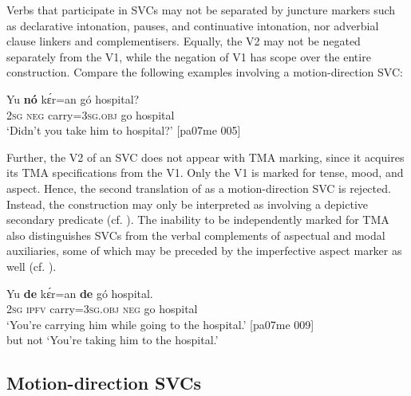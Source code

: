 Verbs that participate in SVCs may not be separated by juncture markers such as declarative intonation, pauses, and continuative intonation, nor adverbial clause linkers and complementisers. Equally, the V2 may not be negated separately from the V1, while the negation of V1 has scope over the entire construction. Compare the following examples involving a motion-direction SVC:



\z


\ea%
    \label{ex:key:1541}
    \gll Yu  \textbf{nó}  kɛ́r=an    gó  hospital?\\
\textsc{2sg}  \textsc{neg}  carry=\textsc{3sg.obj}  go  hospital\\
\glt ‘Didn’t you take him to hospital?’ [pa07me 005]
\z

Further, the V2 of an SVC does not appear with TMA marking, since it acquires its TMA specifications from the V1. Only the V1 is marked for tense, mood, and aspect. Hence, the second translation of  as a motion-direction SVC is rejected. Instead, the construction may only be interpreted as involving a depictive secondary predicate (cf. ). The inability to be independently marked for TMA also distinguishes SVCs from the verbal complements of aspectual and modal auxiliaries, some of which may be preceded by the imperfective aspect marker as well (cf. ). 


\ea%
    \label{ex:key:1542}
    \gll Yu  \textbf{de}  kɛ́r=an    \textbf{de}  gó  hospital.\\
\textsc{2sg}  \textsc{ipfv}  carry=\textsc{3sg.obj}  \textsc{neg}  go  hospital\\

\glt ‘You’re carrying him while going to the hospital.’ [pa07me 009]\\
but not ‘You’re taking him to the hospital.’
\z

\subsection{Motion-direction SVCs}\label{sec:11.2.1}


